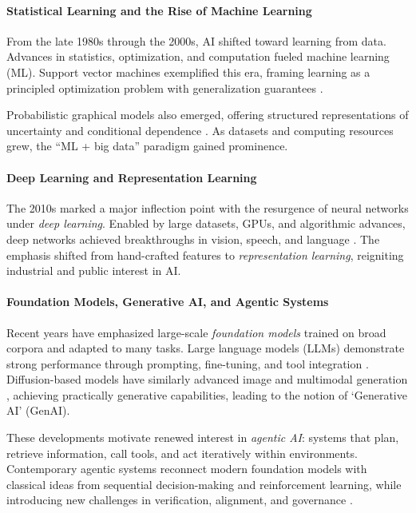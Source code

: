 \documentclass[12pt]{article}
\begin{document}
\paragraph{Statistical Learning and the Rise of Machine Learning}
From the late 1980s through the 2000s, AI shifted toward learning from data. Advances in statistics, optimization, and computation fueled machine learning (ML). Support vector machines exemplified this era, framing learning as a principled optimization problem with generalization guarantees \cite{vapnik_1995,scholkopf_smola_2002}.

Probabilistic graphical models also emerged, offering structured representations of uncertainty and conditional dependence \cite{koller_friedman_2009}. As datasets and computing resources grew, the ``ML + big data'' paradigm gained prominence.

\paragraph{Deep Learning and Representation Learning}
The 2010s marked a major inflection point with the resurgence of neural networks under \emph{deep learning}. Enabled by large datasets, GPUs, and algorithmic advances, deep networks achieved breakthroughs in vision, speech, and language \cite{krizhevsky_etal_2012,lecun_bengio_hinton_2015}. The emphasis shifted from hand-crafted features to \emph{representation learning}, reigniting industrial and public interest in AI.

\paragraph{Foundation Models, Generative AI, and Agentic Systems}
Recent years have emphasized large-scale \emph{foundation models} trained on broad corpora and adapted to many tasks. Large language models (LLMs) demonstrate strong performance through prompting, fine-tuning, and tool integration \cite{brown_etal_2020,bommasani_etal_2021}. Diffusion-based models have similarly advanced image and multimodal generation \cite{ho_etal_2020}, achieving practically generative capabilities, leading to the notion of `Generative AI' (GenAI).

These developments motivate renewed interest in \emph{agentic AI}: systems that plan, retrieve information, call tools, and act iteratively within environments. Contemporary agentic systems reconnect modern foundation models with classical ideas from sequential decision-making and reinforcement learning, while introducing new challenges in verification, alignment, and governance \cite{plaat_etal_2025_agentic_llms_survey}.
\end{document}
